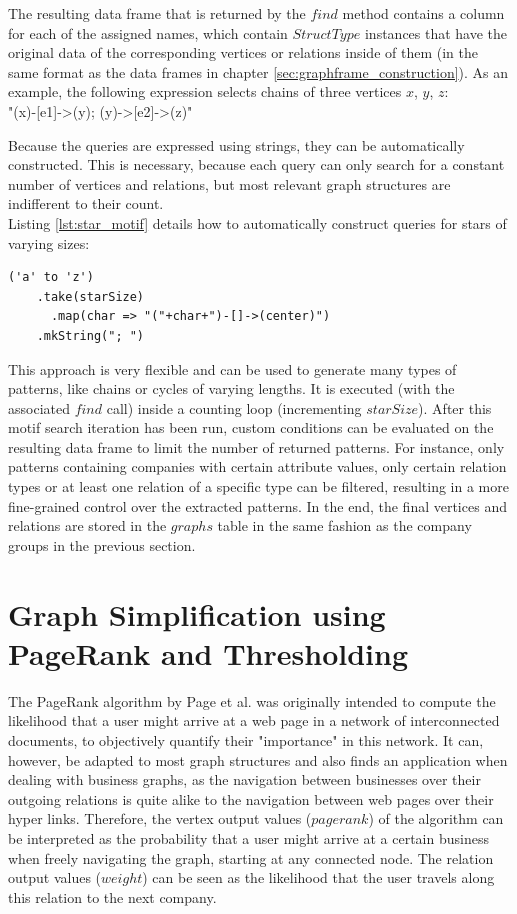 \documentclass[
        a4paper,     %
        titlepage,   %
        oneside,     %
        parskip      %
]{scrartcl}          %
\begin{document}
  The resulting data frame that is returned by the $find$ method contains a column
  for each of the assigned names, which contain $StructType$ instances that have the original
  data of the corresponding vertices or relations inside of them
  (in the same format as the data frames in chapter \ref{sec:graphframe_construction}).
  As an example, the following expression selects chains of three vertices $x$, $y$, $z$:\\
  {\small\ttfamily "(x)-[e1]->(y); (y)->[e2]->(z)"}

  Because the queries are expressed using strings, they can be automatically constructed.
  This is necessary, because each query can only search for a constant number of
  vertices and relations, but most relevant graph structures are indifferent
  to their count.\\
  Listing \ref{lst:star_motif} details how to automatically construct queries for
  stars of varying sizes:

  \begin{lstlisting}[style=scalaStyle,caption=Star Motif Query Creation,label=lst:star_motif]
  ('a' to 'z')
    .take(starSize)
	  .map(char => "("+char+")-[]->(center)")
    .mkString("; ")
  \end{lstlisting}

  This approach is very flexible and can be used to generate many types of patterns,
  like chains or cycles of varying lengths. It is executed (with the associated $find$ call)
  inside a counting loop (incrementing $starSize$).
  After this motif search iteration has been run,
  custom conditions can be evaluated on the resulting data frame to limit
  the number of returned patterns. For instance, only patterns containing companies
  with certain attribute values, only certain relation types or at least
  one relation of a specific type can be filtered, resulting in a more fine-grained control
  over the extracted patterns.
  In the end, the final vertices and relations are stored in the $graphs$ table in the same
  fashion as the company groups in the previous section.

  \section{Graph Simplification using PageRank and Thresholding}
  \label{sec:graph_simplification}
  The PageRank algorithm by Page et al. \cite{pagerank1999} was originally intended
  to compute the likelihood that a user might arrive at a web page
  in a network of interconnected documents, to objectively quantify their "importance" in this network.
  It can, however, be adapted to most
  graph structures and also finds an application when dealing with business graphs,
  as the navigation between businesses over their outgoing relations is quite
  alike to the navigation between web pages over their hyper links.
  Therefore, the vertex output values ($pagerank$) of the algorithm can be interpreted as the
  probability that a user might arrive at a certain business when freely
  navigating the graph, starting at any connected node.
  The relation output values ($weight$) can be seen as the likelihood that the user
  travels along this relation to the next company.
\end{document}
